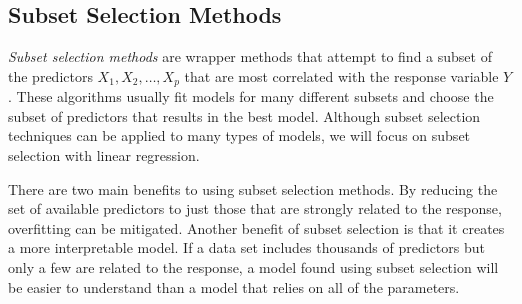 \documentclass{article}
\begin{document}
	\subsection{Subset Selection Methods}
	
	\textit{Subset selection methods} are wrapper methods that attempt to find a subset of the predictors $X_1, X_2, \dotsc, X_p$ that are most correlated with the response variable $Y$. These algorithms usually fit models for many different subsets and choose the subset of predictors that results in the best model. Although subset selection techniques can be applied to many types of models, we will focus on subset selection with linear regression.
	
	There are two main benefits to using subset selection methods. By reducing the set of available predictors to just those that are strongly related to the response, overfitting can be mitigated. Another benefit of subset selection is that it creates a more interpretable model. If a data set includes thousands of predictors but only a few are related to the response, a model found using subset selection will be easier to understand than a model that relies on all of the parameters. 
	

	
\end{document}
